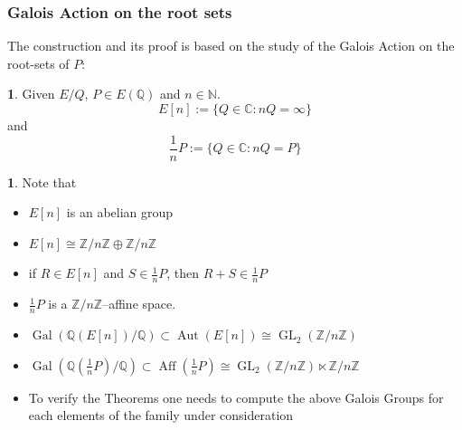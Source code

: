 \documentclass[12pt,handout]{beamer} %
\newcommand{\Q}{\mathbb Q}
\newcommand{\Z}{\mathbb Z}
\newcommand{\N}{\mathbb N}
\newcommand{\C}{\mathbb C}
\theoremstyle{definition}
\newtheorem{rem}[theorem]{\translate{Remark}}
\newtheorem{Defi}[theorem]{\translate{Definition}}
\begin{document}
\begin{frame}
 \frametitle{Galois Action on the root sets}
 
 The construction and its proof is based on the study of the Galois Action on the root-sets of $P$:\pause

 \begin{Defi} Given $E/Q$, $P\in E(\Q)$ and $n\in\N$. 
 $$E[n]:=\{Q\in\C: nQ=\infty\}$$
 and
 $$\frac1nP:=\{Q\in\C: nQ=P\}$$
  \end{Defi}\pause

  \begin{rem} Note that
  \begin{itemize}[<+-|alert@+>]
   \item $E[n]$ is an abelian group
   \item $E[n]\cong \Z/n\Z\oplus \Z/n\Z$
   \item if $R\in E[n]$ and $S\in \frac1nP$, then
   $R+S\in\frac1nP$
   \item $\frac1nP$ is a $\Z/n\Z$--affine space.
   \item $\operatorname{Gal}(\Q(E[n])/\Q)\subset\operatorname{Aut}(E[n])\cong\operatorname{GL}_2(\Z/n\Z)$
   \item $\operatorname{Gal}(\Q(\frac{1}{n}P)/\Q)\subset\operatorname{Aff}(\frac{1}n{P})\cong\operatorname{GL}_2(\Z/n\Z)\ltimes \Z/n\Z$
   \item To verify the Theorems one needs to compute the above Galois Groups for each elements of the family under consideration
   \end{itemize}
  \end{rem}
 \end{frame}
\end{document}
